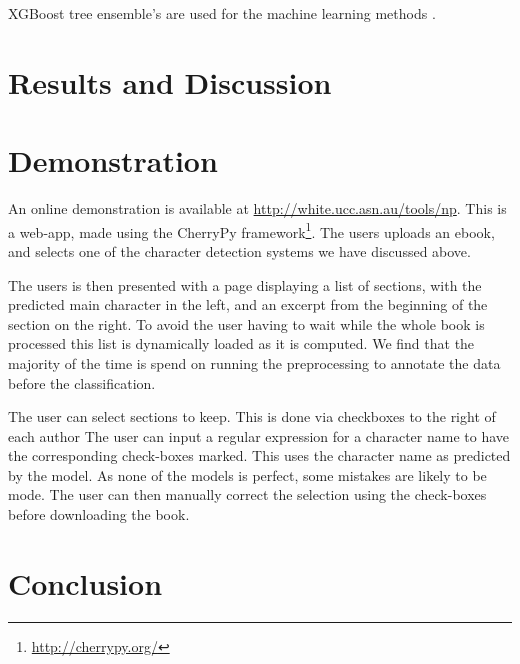 \documentclass[11pt,a4paper]{article}
\newcommand{\parencite}{\citep}
\begin{document}
XGBoost tree ensemble's are used for the machine learning methods \parencite{chen2016xgboost}.






\section{Results and Discussion}\label{sec:results-and-discussion}


\section{Demonstration}
An online demonstration is available at \url{http://white.ucc.asn.au/tools/np}.
This is a web-app, made using the CherryPy framework\footnote{\url{http://cherrypy.org/}}.
The users uploads an ebook, and selects one of the character detection systems we have discussed above.

The users is then presented with a page displaying a list of sections,
with the predicted main character in the left, and an excerpt from the beginning of the section on the right.
To avoid the user having to wait while the whole book is processed this list is dynamically loaded as it is computed.
We find that the majority of the time is spend on running the preprocessing to annotate the data before the classification.

The user can select sections to keep.
This is done via checkboxes to the right of each author
The user can input a regular expression for a character name to have the corresponding check-boxes marked.
This uses the character name as predicted by the model.
As none of the models is perfect, some mistakes are likely to be mode.
The user can then manually correct the selection using the check-boxes before downloading the book.




\section{Conclusion}\label{sec:conclusion}

\clearpage

\end{document}
